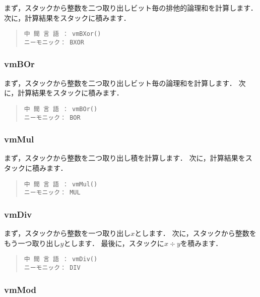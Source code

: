 まず，スタックから整数を二つ取り出しビット毎の排他的論理和を計算します．
次に，計算結果をスタックに積みます．

\begin{quote}
\begin{verbatim}
中 間 言 語 ： vmBXor()
ニーモニック： BXOR
\end{verbatim}
\end{quote}

\subsubsection{vmBOr}

まず，スタックから整数を二つ取り出しビット毎の論理和を計算します．
次に，計算結果をスタックに積みます．

\begin{quote}
\begin{verbatim}
中 間 言 語 ： vmBOr()
ニーモニック： BOR
\end{verbatim}
\end{quote}

\subsubsection{vmMul}

まず，スタックから整数を二つ取り出し積を計算します．
次に，計算結果をスタックに積みます．

\begin{quote}
\begin{verbatim}
中 間 言 語 ： vmMul()
ニーモニック： MUL
\end{verbatim}
\end{quote}

\subsubsection{vmDiv}

まず，スタックから整数を一つ取り出し$x$とします．
次に，スタックから整数をもう一つ取り出し$y$とします．
最後に，スタックに$x \div y$を積みます．

\begin{quote}
\begin{verbatim}
中 間 言 語 ： vmDiv()
ニーモニック： DIV
\end{verbatim}
\end{quote}

\subsubsection{vmMod}


